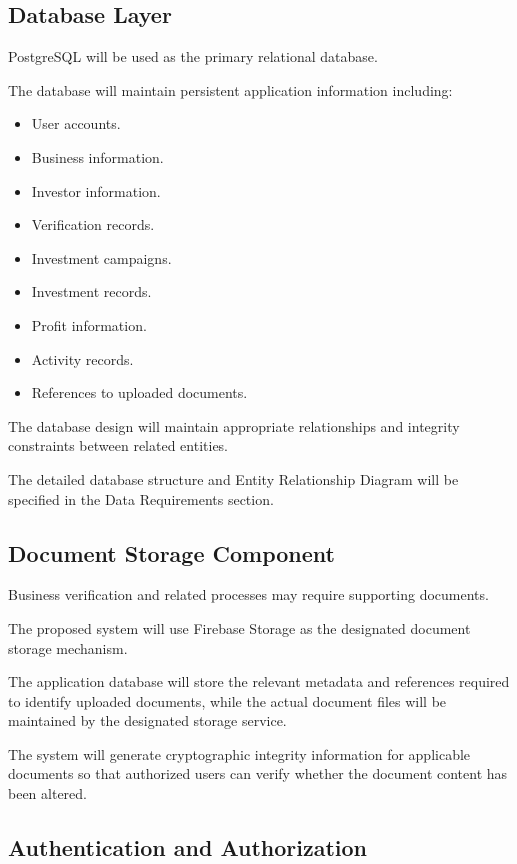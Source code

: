 \subsection{Database Layer}

PostgreSQL will be used as the primary relational database.

The database will maintain persistent application information including:

\begin{itemize}
    \item User accounts.
    \item Business information.
    \item Investor information.
    \item Verification records.
    \item Investment campaigns.
    \item Investment records.
    \item Profit information.
    \item Activity records.
    \item References to uploaded documents.
\end{itemize}

The database design will maintain appropriate relationships and integrity
constraints between related entities.

The detailed database structure and Entity Relationship Diagram will be
specified in the Data Requirements section.


\subsection{Document Storage Component}

Business verification and related processes may require supporting
documents.

The proposed system will use Firebase Storage as the designated document
storage mechanism.

The application database will store the relevant metadata and references
required to identify uploaded documents, while the actual document files
will be maintained by the designated storage service.

The system will generate cryptographic integrity information for applicable
documents so that authorized users can verify whether the document content
has been altered.


\subsection{Authentication and Authorization}

